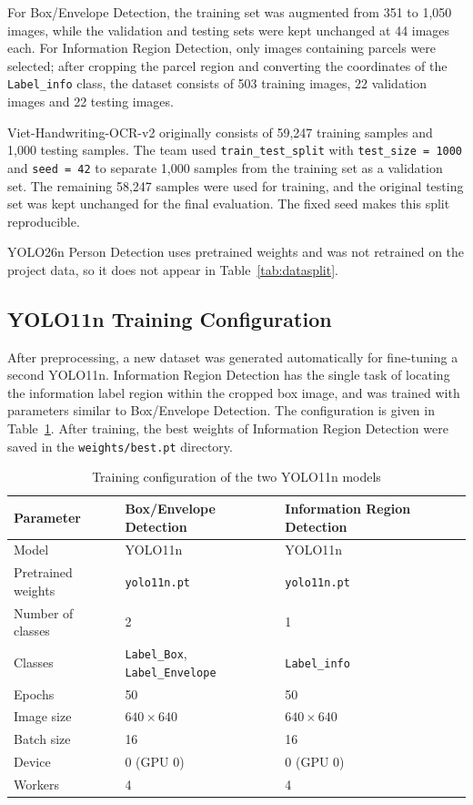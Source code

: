 For Box/Envelope Detection, the training set was augmented from 351 to 1,050 images, while the validation and testing sets were kept unchanged at 44 images each. For Information Region Detection, only images containing parcels were selected; after cropping the parcel region and converting the coordinates of the \texttt{Label\_info} class, the dataset consists of 503 training images, 22 validation images and 22 testing images.

Viet-Handwriting-OCR-v2 originally consists of 59,247 training samples and 1,000 testing samples. The team used \texttt{train\_test\_split} with \texttt{test\_size = 1000} and \texttt{seed = 42} to separate 1,000 samples from the training set as a validation set. The remaining 58,247 samples were used for training, and the original testing set was kept unchanged for the final evaluation. The fixed seed makes this split reproducible.

YOLO26n Person Detection uses pretrained weights and was not retrained on the project data, so it does not appear in Table~\ref{tab:datasplit}.

\subsection{YOLO11n Training Configuration}

After preprocessing, a new dataset was generated automatically for fine-tuning a second YOLO11n. Information Region Detection has the single task of locating the information label region within the cropped box image, and was trained with parameters similar to Box/Envelope Detection. The configuration is given in Table~\ref{tab:yolocfg}. After training, the best weights of Information Region Detection were saved in the \texttt{weights/best.pt} directory.

\begin{table}[htbp]
\centering
\caption{Training configuration of the two YOLO11n models}
\label{tab:yolocfg}
\small
\begin{tabular}{lll}
\hline
\textbf{Parameter} & \textbf{Box/Envelope Detection} & \textbf{Information Region Detection} \\
\hline
Model & YOLO11n & YOLO11n \\
Pretrained weights & \texttt{yolo11n.pt} & \texttt{yolo11n.pt} \\
Number of classes & 2 & 1 \\
Classes & \texttt{Label\_Box}, \texttt{Label\_Envelope} & \texttt{Label\_info} \\
Epochs & 50 & 50 \\
Image size & $640 \times 640$ & $640 \times 640$ \\
Batch size & 16 & 16 \\
Device & 0 (GPU 0) & 0 (GPU 0) \\
Workers & 4 & 4 \\
\hline
\end{tabular}
\end{table}

